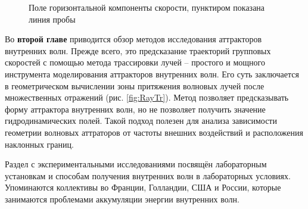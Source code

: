 \documentclass[utf8x]{G7-32} %
\begin{document}
\begin{figure}[!ht]
    \centering
    \caption{Поле горизонтальной компоненты скорости, пунктиром показана линия пробы}
    \label{fig:attractorRes}
\end{figure}

Во \textbf{второй главе} приводится обзор методов исследования аттракторов внутренних волн. Прежде всего, это предсказание траекторий групповых скоростей с помощью метода трассировки лучей -- простого и мощного инструмента моделирования аттракторов внутренних волн. Его суть заключается в геометрическом вычислении зоны притяжения волновых лучей после множественных отражений (рис. \ref{fig:RayTr}). Метод позволяет предсказывать форму аттрактора внутренних волн, но не позволяет получить значение гидродинамических полей. 
Такой подход полезен для анализа зависимости геометрии волновых аттраторов от частоты внешних воздействий и расположения наклонных границ.

Раздел с экспериментальными исследованиями посвящён лабораторным установкам и способам получения внутренних волн в лабораторных условиях. Упоминаются коллективы во Франции, Голландии, США и России, которые занимаются проблемами аккумуляции энергии внутренних волн.
\end{document}
